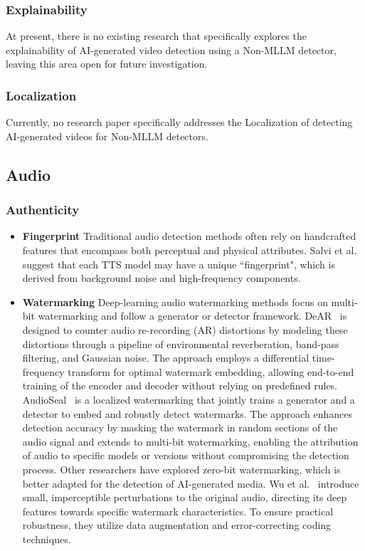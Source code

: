 \subsubsection{\textbf{Explainability}}
At present, there is no existing research that specifically explores the explainability of AI-generated video detection using a Non-MLLM detector, leaving this area open for future investigation.

\subsubsection{\textbf{Localization}}
Currently, no research paper specifically addresses the Localization of detecting AI-generated videos for Non-MLLM detectors.


\subsection{Audio}
\subsubsection{\textbf{Authenticity}}
\begin{itemize}
    \item \textbf{Fingerprint}
    Traditional audio detection methods often rely on handcrafted features that encompass both perceptual and physical attributes. Salvi et al.~\cite{salvi2024listening} suggest that each TTS model may have a unique ``fingerprint", which is derived from background noise and high-frequency components. 
    \item\textbf{Watermarking}
    Deep-learning audio watermarking methods focus on multi-bit watermarking and follow a generator or detector framework.
    DeAR~\cite{liu2023dear} is designed to counter audio re-recording (AR) distortions by modeling these distortions through a pipeline of environmental reverberation, band-pass filtering, and Gaussian noise. The approach employs a differential time-frequency transform for optimal watermark embedding, allowing end-to-end training of the encoder and decoder without relying on predefined rules.
    AudioSeal~\cite{roman2024proactive} is a localized watermarking that jointly trains a generator and a detector to embed and robustly detect watermarks. The approach enhances detection accuracy by masking the watermark in random sections of the audio signal and extends to multi-bit watermarking, enabling the attribution of audio to specific models or versions without compromising the detection process.
    Other researchers have explored zero-bit watermarking, which is better adapted for the detection of AI-generated media. 
    Wu et al.~\cite{wu2023adversarial} introduce small, imperceptible perturbations to the original audio, directing its deep features towards specific watermark characteristics. To ensure practical robustness, they utilize data augmentation and error-correcting coding techniques.
    \end{itemize}
    

